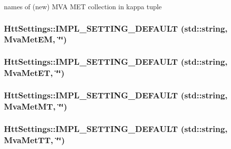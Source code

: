 names of (new) MVA MET collection in kappa tuple \hypertarget{classHttSettings_ac7c2fb6a9290e1fad8423b369af8d0d4}{
\subsubsection[{IMPL\_\-SETTING\_\-DEFAULT}]{\setlength{\rightskip}{0pt plus 5cm}HttSettings::IMPL\_\-SETTING\_\-DEFAULT (std::string, \/  MvaMetEM, \/  \char`\"{}\char`\"{})}}
\label{classHttSettings_ac7c2fb6a9290e1fad8423b369af8d0d4}
\hypertarget{classHttSettings_afb075e653510a1bf5abc085da9149091}{
\subsubsection[{IMPL\_\-SETTING\_\-DEFAULT}]{\setlength{\rightskip}{0pt plus 5cm}HttSettings::IMPL\_\-SETTING\_\-DEFAULT (std::string, \/  MvaMetET, \/  \char`\"{}\char`\"{})}}
\label{classHttSettings_afb075e653510a1bf5abc085da9149091}
\hypertarget{classHttSettings_ad57514c4c90610ffa0dbfb7573adeed2}{
\subsubsection[{IMPL\_\-SETTING\_\-DEFAULT}]{\setlength{\rightskip}{0pt plus 5cm}HttSettings::IMPL\_\-SETTING\_\-DEFAULT (std::string, \/  MvaMetMT, \/  \char`\"{}\char`\"{})}}
\label{classHttSettings_ad57514c4c90610ffa0dbfb7573adeed2}
\hypertarget{classHttSettings_ae668fb9a956228f73d235f0f6cdd345b}{
\subsubsection[{IMPL\_\-SETTING\_\-DEFAULT}]{\setlength{\rightskip}{0pt plus 5cm}HttSettings::IMPL\_\-SETTING\_\-DEFAULT (std::string, \/  MvaMetTT, \/  \char`\"{}\char`\"{})}}
\label{classHttSettings_ae668fb9a956228f73d235f0f6cdd345b}


